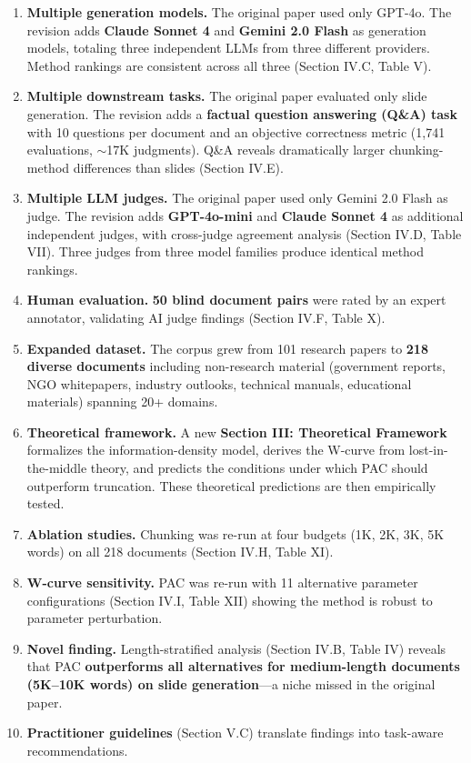 \documentclass[11pt]{article}
\begin{document}
\begin{enumerate}
    \item \textbf{Multiple generation models.} The original paper used only GPT-4o. The revision adds \textbf{Claude Sonnet 4} and \textbf{Gemini 2.0 Flash} as generation models, totaling three independent LLMs from three different providers. Method rankings are consistent across all three (Section IV.C, Table V).
    \item \textbf{Multiple downstream tasks.} The original paper evaluated only slide generation. The revision adds a \textbf{factual question answering (Q\&A) task} with 10 questions per document and an objective correctness metric (1{,}741 evaluations, $\sim$17K judgments). Q\&A reveals dramatically larger chunking-method differences than slides (Section IV.E).
    \item \textbf{Multiple LLM judges.} The original paper used only Gemini 2.0 Flash as judge. The revision adds \textbf{GPT-4o-mini} and \textbf{Claude Sonnet 4} as additional independent judges, with cross-judge agreement analysis (Section IV.D, Table VII). Three judges from three model families produce identical method rankings.
    \item \textbf{Human evaluation.} \textbf{50 blind document pairs} were rated by an expert annotator, validating AI judge findings (Section IV.F, Table X).
    \item \textbf{Expanded dataset.} The corpus grew from 101 research papers to \textbf{218 diverse documents} including non-research material (government reports, NGO whitepapers, industry outlooks, technical manuals, educational materials) spanning 20+ domains.
    \item \textbf{Theoretical framework.} A new \textbf{Section III: Theoretical Framework} formalizes the information-density model, derives the W-curve from lost-in-the-middle theory, and predicts the conditions under which PAC should outperform truncation. These theoretical predictions are then empirically tested.
    \item \textbf{Ablation studies.} Chunking was re-run at four budgets (1K, 2K, 3K, 5K words) on all 218 documents (Section IV.H, Table XI).
    \item \textbf{W-curve sensitivity.} PAC was re-run with 11 alternative parameter configurations (Section IV.I, Table XII) showing the method is robust to parameter perturbation.
    \item \textbf{Novel finding.} Length-stratified analysis (Section IV.B, Table IV) reveals that PAC \textbf{outperforms all alternatives for medium-length documents (5K--10K words) on slide generation}---a niche missed in the original paper.
    \item \textbf{Practitioner guidelines} (Section V.C) translate findings into task-aware recommendations.
\end{enumerate}
\end{document}
